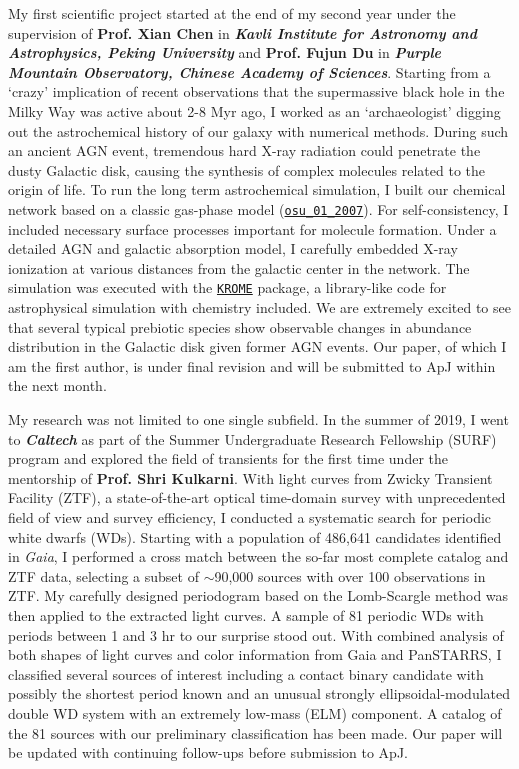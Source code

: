 My first scientific project started at the end of my second year under the supervision of \textbf{Prof. Xian Chen} in \textbf{\textit{Kavli Institute for Astronomy and Astrophysics, Peking University}} and \textbf{Prof. Fujun Du} in \textbf{\textit{Purple Mountain Observatory, Chinese Academy of Sciences}}. Starting from a `crazy' implication of recent observations that the supermassive black hole in the Milky Way was active about 2-8 Myr ago, I worked as an `archaeologist' digging out the astrochemical history of our galaxy with numerical methods. During such an ancient AGN event, tremendous hard X-ray radiation could penetrate the dusty Galactic disk, causing the synthesis of complex molecules related to the origin of life. To run the long term astrochemical simulation, I built our chemical network based on a classic gas-phase model (\href{http://faculty.virginia.edu/ericherb/research_files/osu_01_2007}{\texttt{osu\_01\_2007}}). For self-consistency, I included necessary surface processes important for molecule formation. Under a detailed AGN and galactic absorption model, I carefully embedded X-ray ionization at various distances from the galactic center in the network. The simulation was executed with the \href{http://kromepackage.org}{\texttt{KROME}} package, a library-like code for astrophysical simulation with chemistry included. We are extremely excited to see that several typical prebiotic species show observable changes in abundance distribution in the Galactic disk given former AGN events. Our paper, of which I am the first author, is under final revision and will be submitted to ApJ within the next month.

My research was not limited to one single subfield. In the summer of 2019, I went to \textbf{\textit{Caltech}} as part of the Summer Undergraduate Research Fellowship (SURF) program and explored the field of transients for the first time under the mentorship of \textbf{Prof. Shri Kulkarni}. With light curves from Zwicky Transient Facility (ZTF), a state-of-the-art optical time-domain survey with unprecedented field of view and survey efficiency, I conducted a systematic search for periodic white dwarfs (WDs). Starting with a population of 486,641  candidates identified in \textit{Gaia}, I performed a cross match between the so-far most complete catalog and ZTF data, selecting a subset of $\sim$90,000 sources with over 100 observations in ZTF. My carefully designed periodogram based on the Lomb-Scargle method was then applied to the extracted light curves. A sample of 81 periodic WDs with periods between 1 and 3 hr to our surprise stood out. With combined analysis of both shapes of light curves and color information from Gaia and PanSTARRS, I classified several sources of interest including a contact binary candidate with possibly the shortest period known and an unusual strongly ellipsoidal-modulated double WD system with an extremely low-mass (ELM) component. A catalog of the 81 sources with our preliminary classification has been made. Our paper will be updated with continuing follow-ups before submission to ApJ.

